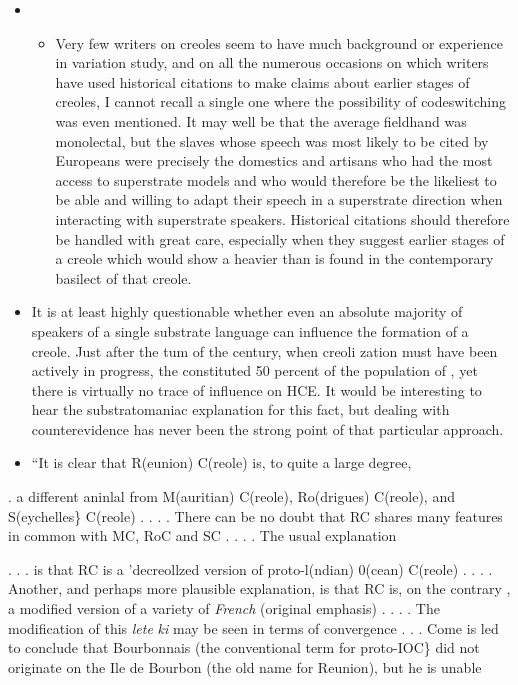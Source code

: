 \begin{itemize}
\begin{itemize}
\begin{itemize}
\begin{itemize}
\begin{itemize}
\item %
\begin{itemize}
\item Very few writers on creoles seem to have much background or experience in variation study, and on all the numerous occasions on which writers have used historical citations to make claims about earlier stages of creoles, I cannot recall a single one where the possi\-bility of codeswitching was even mentioned. It may well be that the average fieldhand was monolectal, but the slaves whose speech was most likely to be cited by Europeans were precisely the domestics and artisans who had the most access to superstrate models and who would therefore be the likeliest to be able and willing to adapt their speech in a superstrate direction when interacting with superstrate speakers. Historical citations should therefore be handled with great care, especially when they suggest earlier stages of a creole which would show a heavier  than is found in the con\-temporary basilect of that creole.
\end{itemize}
\end{itemize}
\begin{itemize}
\item It is at least highly questionable whether even an absolute majority of speakers of a single substrate language can influence the formation of a creole. Just after the tum of the century, when creoli zation must have been actively in progress, the  constituted 50 percent of the population of , yet there is virtually no trace of  influence on HCE. It would be interesting to hear the substratomaniac explanation for this fact, but dealing with counter\-evidence has never been the strong point of that particular approach.
\item ``It is clear that R(eunion) C(reole) is, to quite a large degree,
\end{itemize}

. a different aninlal from M(auritian) C(reole), Ro(drigues) C(reole), and S(eychelles\} C(reole) . . . . There can be no doubt that RC shares many features in common with MC, RoC and SC . . . . The usual explanation

. . . is that RC is a 'decreollzed version of proto-l(ndian) 0(cean) C(reole) . . . . Another, and perhaps more plausible explanation, is that RC is, on the contrary , a modified version of a variety of \textit{French} (original emphasis) . . . . The modification of this \textit{lete} \textit{ki}  may be seen in terms of convergence . . . Come is led to conclude that Bourbonnais (the conventional term for proto-IOC\} did not originate on the Ile de Bourbon (the old name for Reunion), but he is unable


\end{itemize}
\end{itemize}
\end{itemize}
\end{itemize}
